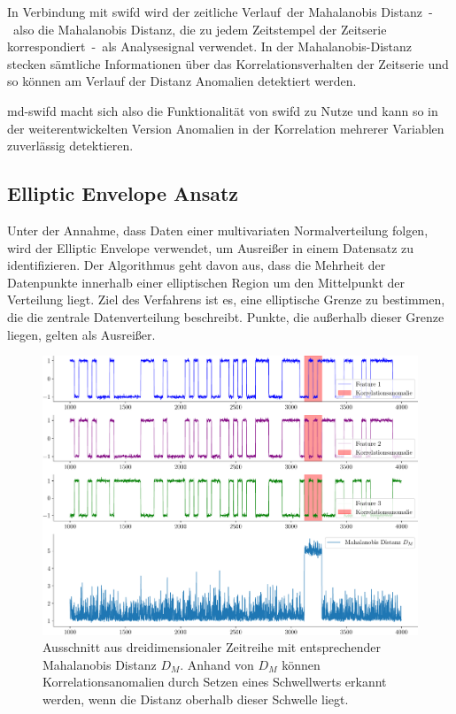 In Verbindung mit \ac{swifd} wird der \glqq zeitliche Verlauf\grqq~der Mahalanobis Distanz~-~also die
Mahalanobis Distanz, die zu jedem Zeitstempel der Zeitserie korrespondiert~-~als Analysesignal verwendet. In der Mahalanobis-Distanz stecken sämtliche
Informationen über das Korrelationsverhalten der Zeitserie und so können am Verlauf der Distanz Anomalien detektiert werden.

\ac{md-swifd} macht sich also die Funktionalität von \ac{swifd} zu Nutze und kann so in der weiterentwickelten Version Anomalien in der Korrelation mehrerer Variablen
zuverlässig detektieren.

\subsection{Elliptic Envelope Ansatz}
Unter der Annahme, dass Daten einer multivariaten Normalverteilung folgen, wird der Elliptic Envelope verwendet, um Ausreißer in einem Datensatz zu
identifizieren. Der Algorithmus geht davon aus, dass die Mehrheit der Datenpunkte innerhalb einer elliptischen Region um den Mittelpunkt der Verteilung
liegt. Ziel des Verfahrens ist es, eine elliptische Grenze zu bestimmen, die die zentrale Datenverteilung beschreibt. Punkte, die außerhalb dieser Grenze
liegen, gelten als Ausreißer.

\begin{figure}[t!]
    \centering
        \includegraphics[width=1\linewidth]{ch4_anomalien/abbildungen/EE_mahalanobis.pdf}
    \caption{\centering Ausschnitt aus dreidimensionaler Zeitreihe mit entsprechender Mahalanobis Distanz $D_M$. Anhand von $D_M$ können Korrelationsanomalien
        durch Setzen eines Schwellwerts erkannt werden, wenn die Distanz oberhalb dieser Schwelle liegt.}
\label{fig:EE_mahalanobis}
\end{figure}

